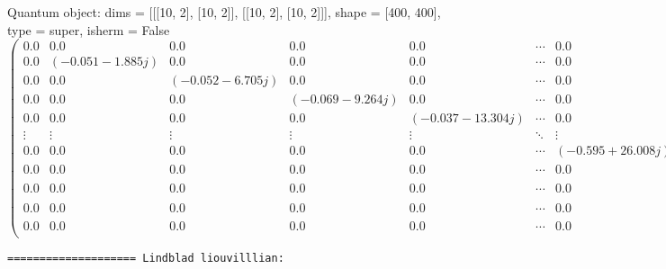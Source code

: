 \documentclass{article}
\begin{document}
    Quantum object: dims = [[[10, 2], [10, 2]], [[10, 2], [10, 2]]], shape = [400, 400], type = super, isherm = False\begin{equation*}\begin{pmatrix}0.0 & 0.0 & 0.0 & 0.0 & 0.0 & \cdots & 0.0 & 0.0 & 0.0 & 0.0 & 0.0\\0.0 & (-0.051-1.885j) & 0.0 & 0.0 & 0.0 & \cdots & 0.0 & 0.0 & 0.0 & 0.0 & 0.0\\0.0 & 0.0 & (-0.052-6.705j) & 0.0 & 0.0 & \cdots & 0.0 & 0.0 & 0.0 & 0.0 & 0.0\\0.0 & 0.0 & 0.0 & (-0.069-9.264j) & 0.0 & \cdots & 0.0 & 0.0 & 0.0 & 0.0 & 0.0\\0.0 & 0.0 & 0.0 & 0.0 & (-0.037-13.304j) & \cdots & 0.0 & 0.0 & 0.0 & 0.0 & 0.0\\\vdots & \vdots & \vdots & \vdots & \vdots & \ddots & \vdots & \vdots & \vdots & \vdots & \vdots\\0.0 & 0.0 & 0.0 & 0.0 & 0.0 & \cdots & (-0.595+26.008j) & 0.0 & 0.0 & 0.0 & 0.0\\0.0 & 0.0 & 0.0 & 0.0 & 0.0 & \cdots & 0.0 & (-0.557+16.303j) & 0.0 & 0.0 & 0.0\\0.0 & 0.0 & 0.0 & 0.0 & 0.0 & \cdots & 0.0 & 0.0 & (-0.681+14.149j) & 0.0 & 0.0\\0.0 & 0.0 & 0.0 & 0.0 & 0.0 & \cdots & 0.0 & 0.0 & 0.0 & (-0.514+0.513j) & 0.0\\0.0 & 0.0 & 0.0 & 0.0 & 0.0 & \cdots & 0.0 & 0.0 & 0.0 & 0.0 & -0.948\\\end{pmatrix}\end{equation*}

    
    \begin{Verbatim}[commandchars=\\\{\}]
==================== Lindblad liouvilllian:
    \end{Verbatim}
\end{document}
